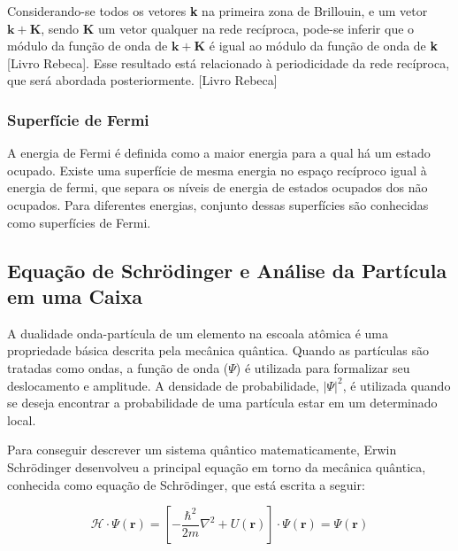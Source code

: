 \documentclass[11pt]{article}
\numberwithin{equation}{section}
\begin{document}
      \par Considerando-se todos os vetores \textbf{k} na primeira zona de Brillouin, e um vetor $\mathbf{k}+\mathbf{K}$, sendo \textbf{K} um vetor qualquer na rede recíproca, pode-se inferir que o módulo da função de onda de $\mathbf{k}+\mathbf{K}$ é igual ao módulo da função de onda  de \textbf{k} [Livro Rebeca]. Esse resultado está relacionado à periodicidade da rede recíproca, que será abordada posteriormente. [Livro Rebeca]

    \subsubsection{Superfície de Fermi}

      \par A energia de Fermi é definida como a maior energia para a qual há um estado ocupado. Existe uma superfície de mesma energia no espaço recíproco igual à energia de fermi, que separa os níveis de energia de estados ocupados dos não ocupados. Para diferentes energias, conjunto dessas superfícies são conhecidas como superfícies de Fermi.

  \subsection{Equação de Schrödinger e Análise da Partícula em uma Caixa}

    \par A dualidade onda-partícula de um elemento na escoala atômica é uma propriedade básica descrita pela mecânica quântica\cite{qm_fis3}. Quando as partículas são tratadas como ondas, a função de onda ($\Psi$) é utilizada para formalizar seu deslocamento e amplitude\cite{qm_fis4}. A densidade de probabilidade, $\left| \Psi \right|^2$, é utilizada quando se deseja encontrar a probabilidade de uma partícula estar em um determinado local.

    \par Para conseguir descrever um sistema quântico matematicamente, Erwin Schrödinger desenvolveu a principal equação em torno da mecânica quântica, conhecida como equação de Schrödinger, que está escrita a seguir:

    \begin{equation}\label{eq_schrodinger_main}
      \mathcal{H} \cdot \Psi(\mathbf{r}) = \left[ -\frac{\hbar^2}{2m}\nabla^2 + U(\textbf{r}) \right] \cdot \Psi(\mathbf{r}) = \Psi(\mathbf{r})
    \end{equation}
\end{document}
